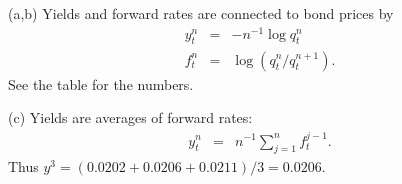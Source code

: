 \documentclass[11pt]{exam}
\begin{document}
\begin{questions}
\begin{solution}
\begin{parts}
\item [(a,b)] Yields and forward rates are connected to bond prices by 
\begin{eqnarray*}
    y^n_t &=& - n^{-1} \log q^n_t \\
    f^n_t &=& \log (q^{n}_t/q^{n+1}_t) .
\end{eqnarray*} 
See the table for the numbers.  
\item [(c)] Yields are averages of forward rates:
\begin{eqnarray*}
    y^n_t &=& n^{-1} \sum_{j=1}^n f^{j-1}_t .
\end{eqnarray*}
Thus $y^3 = (0.0202 + 0.0206 +  0.0211)/3 = 0.0206$.
\end{parts}
\end{solution}


\end{questions}


\end{document}
